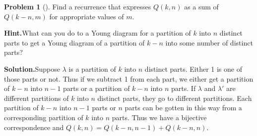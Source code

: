 \documentclass[10pt,]{book}
\theoremstyle{plain}
\theoremstyle{definition}
\newtheorem{activity}[project]{Problem}
\theoremstyle{definition}
\numberwithin{equation}{chapter}
\begin{document}
\begin{activity}[]\label{activity-175}
Find a recurrence that expresses \(Q(k,n)\) as a sum of \(Q(k-n,m)\) for appropriate values of \(m\).%
\par\medskip\noindent%
\textbf{Hint.}\quad What can you do to a Young diagram for a partition of \(k\) into \(n\) distinct parts to get a Young diagram of a partition of \(k-n\) into some number of distinct parts?%
\par\medskip\noindent%
\textbf{Solution.}\quad Suppose \(\lambda\) is a partition of \(k\) into \(n\) distinct parts. Either 1 is one of those parts or not. Thus if we subtract 1 from each part, we either get a partition of \(k-n\) into \(n-1\) parts or a partition of \(k-n\) into \(n\) parts. If \(\lambda\) and \(\lambda'\) are different partitions of \(k\) into \(n\) distinct parts, they go to different partitions. Each partition of \(k-n\) into \(n-1\) parts or \(n\) parts can be gotten in this way from a corresponding partition of \(k\) into \(n\) parts. Thus we have a bijective correspondence and \(Q(k,n)=Q(k-n,n-1) +Q(k-n,n)\).%
\end{activity}
\end{document}
